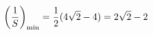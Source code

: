 \documentclass[preview]{standalone}
\begin{document}
\begin{align*}
\special{dvisvgm:raw <g id='unique000'>}\left(\frac{1}{S}\right)_{\min}=\frac12(4\sqrt2-4)=2\sqrt2-2\special{dvisvgm:raw </g>}
\end{align*}
\end{document}
